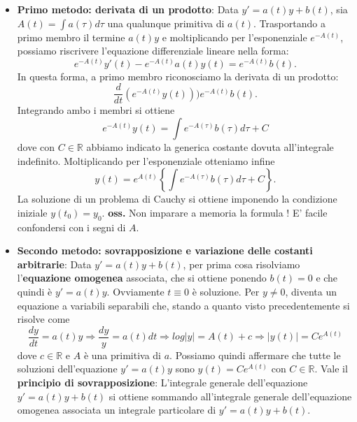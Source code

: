 \begin{itemize}
    \item \textbf{Primo metodo: derivata di un prodotto}:\newline
    Data $y' = a(t) y + b(t)$, sia $A(t) = \int a(\tau)d \tau$ una qualunque primitiva di $a(t)$. Trasportando a primo membro il termine $a(t) y$ e moltiplicando per l'esponenziale $e^{-A(t)}$, possiamo riscrivere l'equazione differenziale lineare nella forma:
    \[
        e^{-A(t)} y'(t) - e^{-A(t)}a(t) y(t) = e^{-A(t)}b(t).
    \]
    In questa forma, a primo membro riconosciamo la derivata di un prodotto:
    \[
        \frac{d}{dt} \left( e^{-A(t)} y(t) \right) ) e^{-A(t)} b(t).
    \]
    Integrando ambo i membri si ottiene
    \[
        e^{-A(t)} y(t) = \int e^{-A(\tau)} b(\tau) d \tau + C
    \]
    dove con $C \in \mathbb{R}$ abbiamo indicato la generica costante dovuta all'integrale indefinito. Moltiplicando per l'esponenziale otteniamo infine
    \[
        y(t) = e^{A(t)}\left\{ \int e^{-A(\tau)} b(\tau) d \tau + C \right\}.
    \]
    La soluzione di un problema di Cauchy si ottiene imponendo la condizione iniziale $y(t_0) = y_0$.
    \textbf{oss.} Non imparare a memoria la formula ! E' facile confondersi con i segni di $A$.
    \item \textbf{Secondo metodo: sovrapposizione e variazione delle costanti arbitrarie}:\newline
    Data $y' = a(t) y + b(t)$, per prima cosa risolviamo l'\textbf{equazione omogenea} associata, che si ottiene ponendo $b(t) = 0$ e che quindi è $y' = a(t) y$. Ovviamente $t \equiv 0$ è soluzione. Per $y\neq 0$, diventa un equazione a variabili separabili che, stando a quanto visto precedentemente si risolve come
    \[
        \frac{dy}{dt} = a(t) y \Rightarrow \frac{dy}{y} = a(t) dt \Rightarrow  log|y| = A(t) + c \Rightarrow |y(t)| = Ce^{A(t)}
    \]
    dove $c \in \mathbb{R}$ e $A$ è una primitiva di $a$.\newline
    \newline
    Possiamo quindi affermare che tutte le soluzioni dell'equazione $y'=a(t) y$ sono $y(t) = Ce^{A(t)}$ con $C \in \mathbb{R}$.\newline
    \newline
    Vale il \textbf{principio di sovrapposizione}:\newline
    L'integrale generale dell'equazione $y' = a(t) y + b(t)$ si ottiene sommando all'integrale generale dell'equazione omogenea associata un integrale particolare di $y' = a(t) y + b(t)$.\newline

\end{itemize}
